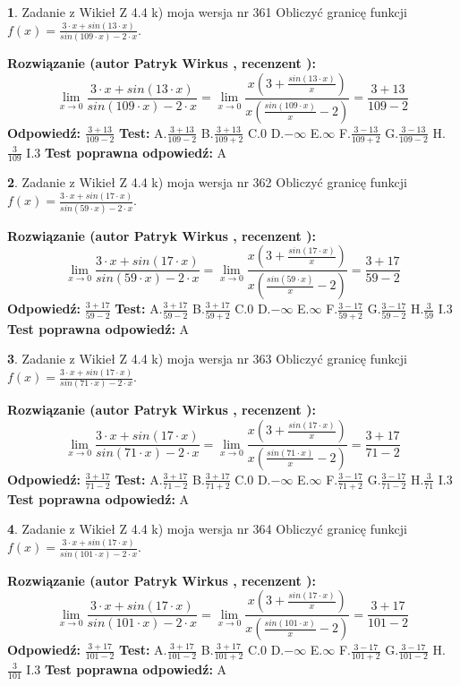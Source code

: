 \documentclass[12pt, a4paper]{article}
\theoremstyle{definition} %
\newtheorem{zad}{}
\newcommand{\zadStart}[1]{\begin{zad}#1\newline}
\newcommand{\zadStop}{\end{zad}}
\newcommand{\rozwStart}[2]{\noindent \textbf{Rozwiązanie (autor #1 , recenzent #2): }\newline}
\newcommand{\rozwStop}{\newline}
\newcommand{\odpStart}{\noindent \textbf{Odpowiedź:}\newline}
\newcommand{\odpStop}{\newline}
\newcommand{\testStart}{\noindent \textbf{Test:}\newline}
\newcommand{\testStop}{\newline}
\newcommand{\kluczStart}{\noindent \textbf{Test poprawna odpowiedź:}\newline}
\newcommand{\kluczStop}{\newline}
\begin{document}
\zadStart{Zadanie z Wikieł Z 4.4 k) moja wersja nr 361}
Obliczyć granicę funkcji $f(x)=\frac{3\cdot x +sin(13\cdot x)}{sin(109\cdot x) -2\cdot x}$.
\zadStop
\rozwStart{Patryk Wirkus}{}
$$\lim\limits_{x\to 0}\frac{3\cdot x +sin(13\cdot x)}{sin(109\cdot x) -2\cdot x}
=\lim\limits_{x\to 0}\frac{x(3+\frac{sin(13\cdot x)}{x})}{x(\frac{sin(109\cdot x)}{x}-2)}
=\frac{3+13}{109-2}$$
\rozwStop
\odpStart
$\frac{3+13}{109-2}$
\odpStop
\testStart
A.$\frac{3+13}{109-2}$
B.$\frac{3+13}{109+2}$
C.$0$
D.$-\infty$
E.$\infty$
F.$\frac{3-13}{109+2}$
G.$\frac{3-13}{109-2}$
H.$\frac{3}{109}$
I.$3$
\testStop
\kluczStart
A
\kluczStop



\zadStart{Zadanie z Wikieł Z 4.4 k) moja wersja nr 362}
Obliczyć granicę funkcji $f(x)=\frac{3\cdot x +sin(17\cdot x)}{sin(59\cdot x) -2\cdot x}$.
\zadStop
\rozwStart{Patryk Wirkus}{}
$$\lim\limits_{x\to 0}\frac{3\cdot x +sin(17\cdot x)}{sin(59\cdot x) -2\cdot x}
=\lim\limits_{x\to 0}\frac{x(3+\frac{sin(17\cdot x)}{x})}{x(\frac{sin(59\cdot x)}{x}-2)}
=\frac{3+17}{59-2}$$
\rozwStop
\odpStart
$\frac{3+17}{59-2}$
\odpStop
\testStart
A.$\frac{3+17}{59-2}$
B.$\frac{3+17}{59+2}$
C.$0$
D.$-\infty$
E.$\infty$
F.$\frac{3-17}{59+2}$
G.$\frac{3-17}{59-2}$
H.$\frac{3}{59}$
I.$3$
\testStop
\kluczStart
A
\kluczStop



\zadStart{Zadanie z Wikieł Z 4.4 k) moja wersja nr 363}
Obliczyć granicę funkcji $f(x)=\frac{3\cdot x +sin(17\cdot x)}{sin(71\cdot x) -2\cdot x}$.
\zadStop
\rozwStart{Patryk Wirkus}{}
$$\lim\limits_{x\to 0}\frac{3\cdot x +sin(17\cdot x)}{sin(71\cdot x) -2\cdot x}
=\lim\limits_{x\to 0}\frac{x(3+\frac{sin(17\cdot x)}{x})}{x(\frac{sin(71\cdot x)}{x}-2)}
=\frac{3+17}{71-2}$$
\rozwStop
\odpStart
$\frac{3+17}{71-2}$
\odpStop
\testStart
A.$\frac{3+17}{71-2}$
B.$\frac{3+17}{71+2}$
C.$0$
D.$-\infty$
E.$\infty$
F.$\frac{3-17}{71+2}$
G.$\frac{3-17}{71-2}$
H.$\frac{3}{71}$
I.$3$
\testStop
\kluczStart
A
\kluczStop



\zadStart{Zadanie z Wikieł Z 4.4 k) moja wersja nr 364}
Obliczyć granicę funkcji $f(x)=\frac{3\cdot x +sin(17\cdot x)}{sin(101\cdot x) -2\cdot x}$.
\zadStop
\rozwStart{Patryk Wirkus}{}
$$\lim\limits_{x\to 0}\frac{3\cdot x +sin(17\cdot x)}{sin(101\cdot x) -2\cdot x}
=\lim\limits_{x\to 0}\frac{x(3+\frac{sin(17\cdot x)}{x})}{x(\frac{sin(101\cdot x)}{x}-2)}
=\frac{3+17}{101-2}$$
\rozwStop
\odpStart
$\frac{3+17}{101-2}$
\odpStop
\testStart
A.$\frac{3+17}{101-2}$
B.$\frac{3+17}{101+2}$
C.$0$
D.$-\infty$
E.$\infty$
F.$\frac{3-17}{101+2}$
G.$\frac{3-17}{101-2}$
H.$\frac{3}{101}$
I.$3$
\testStop
\kluczStart
A
\kluczStop
\end{document}
